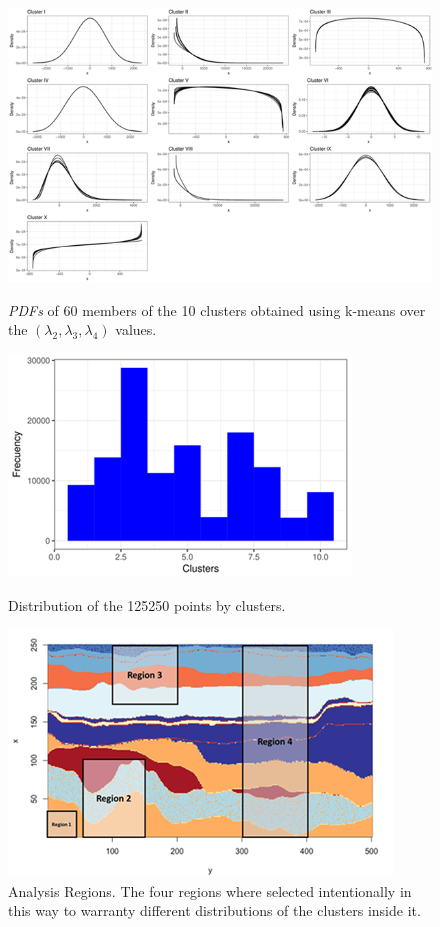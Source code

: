 \documentclass[11pt]{article}
\begin{document}
\begin{figure}[!ht]
    \centering
    \includegraphics{figs/clusters2.png}
    \caption{\textit{PDFs} of 60 members of the 10 clusters obtained using k-means over the $(\lambda_{2}, \lambda_{3}, \lambda_{4})$ values.}
    \label{fig:cluster1}

\begin{multicols}{2}
    \centering
    \includegraphics[scale=0.5]{figs/Clusters_histogram.png}
    \caption{Distribution of the 125250 points by clusters.}
    \centering
    \includegraphics{figs/regions_queries.png}
    \caption{Analysis Regions. The four regions where selected intentionally in this way to warranty different distributions of the clusters inside it.}
\end{multicols}
\end{figure}
\end{document}
